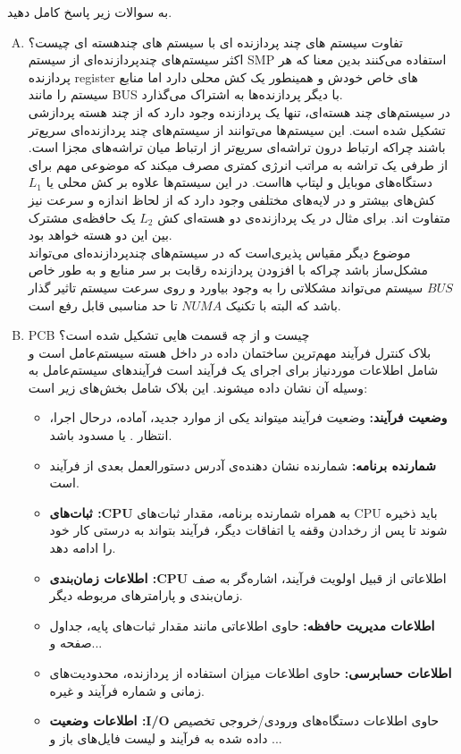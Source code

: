 \documentclass[]{article}
\begin{document}
به سوالات زیر پاسخ کامل دهید.
\vspace{0.2cm}
\begin{enumerate}[(A)]
    \item  تفاوت سیستم های چند پردازنده ای با سیستم های چندهسته ای چیست؟ \\
    اکثر سیستم‌های چندپردازنده‌ای از سیستم
    SMP
    استفاده می‌کنند بدین معنا که هر پردازنده
    register
    های خاص خودش و همینطور یک کش محلی دارد اما منابع سیستم را مانند
    BUS
   با دیگر پردازنده‌ها به اشتراک می‌گذارد.
   \\
   در سیستم‌های چند هسته‌ای،‌ تنها یک پردازنده وجود دارد که از چند هسته پردازشی تشکیل شده است.
   این سیستم‌ها می‌توانند از سیستم‌های چند پردازنده‌ای سریع‌تر باشند چراکه ارتباط درون تراشه‌ای
   سریع‌تر از ارتباط میان تراشه‌های مجزا است.
   از طرفی یک تراشه به مراتب انرژی کمتری مصرف میکند که موضوعی مهم برای دستگاه‌های موبایل و لپتاپ هااست.
   در این سیستم‌ها علاوه بر کش محلی یا
   $L_1$
   کش‌های بیشتر و در لایه‌های مختلفی وجود دارد که از لحاظ اندازه و سرعت نیز متفاوت اند.
   برای مثال در یک پردازنده‌ی دو هسته‌ای کش
   $L_2$
   یک حافظه‌ی مشترک بین این دو هسته خواهد بود. \\
   موضوع دیگر مقیاس پذیری‌است که در سیستم‌های چندپردازنده‌ای می‌تواند مشکل‌ساز باشد چراکه
   با افزودن پردازنده رقابت بر سر منابع و به طور خاص
   $BUS$ سیستم
   می‌تواند مشکلاتی را به وجود بیاورد و روی سرعت سیستم تاثیر گذار باشد که
   البته با تکنیک $NUMA$
   تا حد مناسبی قابل رفع است.

    
    \item PCB
    چیست و از چه قسمت هایی تشکیل شده است؟ \\
    بلاک کنترل فرآیند مهم‌ترین ساختمان داده در داخل هسته سیستم‌عامل است
    و شامل اطلاعات موردنیاز برای اجرای یک فرآیند است فرآیند‌های سیستم‌عامل به وسیله آن نشان داده میشوند.
    این بلاک شامل بخش‌های زیر است:
    \vspace{-0.1cm}
    \begin{itemize}
        \item \textbf{وضعیت فرآیند:}
        وضعیت فرآیند میتواند یکی از موارد جدید، آماده، درحال اجرا، انتظار . یا مسدود باشد.
        \item \textbf{شمارنده برنامه:}
        شمارنده نشان دهنده‌ی آدرس دستورالعمل بعدی از فرآیند است.
        \item \textbf{ثبات‌های :CPU}
        به همراه شمارنده برنامه، مقدار ثبات‌های
        CPU
        باید ذخیره شوند تا پس از رخدادن وقفه یا اتفاقات دیگر، فرآیند بتواند به درستی
        کار خود را ادامه دهد.
        \item \textbf{اطلاعات زمان‌بندی :CPU}
        اطلاعاتی از قبیل اولویت فرآیند، اشاره‌گر به صف زمان‌بندی و پارامتر‌های مربوطه دیگر.
        \item \textbf{اطلاعات مدیریت حافظه:}
        حاوی اطلاعاتی مانند مقدار ثبات‌های پایه، جداول صفحه و...
        \item \textbf{اطلاعات حسابرسی:}
        حاوی اطلاعات میزان استفاده از پردازنده، محدودیت‌های زمانی و شماره فرآیند و غیره.
        \item \textbf{اطلاعات وضعیت :I/O}
        حاوی اطلاعات دستگاه‌های ورودی/خروجی تخصیص داده شده به فرآیند و لیست فایل‌های باز و ...
    \end{itemize}


\end{enumerate}
\end{document}
